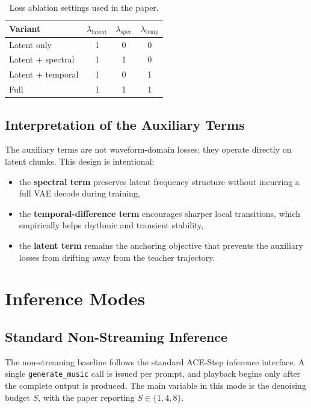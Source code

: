 \documentclass[11pt]{article}
\begin{document}
\begin{table}[H]
\centering
\caption{Loss ablation settings used in the paper.}
\label{tab:supp_loss_variants}
\begin{tabular}{@{}lccc@{}}
\toprule
\textbf{Variant} & \(\lambda_{\mathrm{latent}}\) & \(\lambda_{\mathrm{spec}}\) & \(\lambda_{\mathrm{temp}}\) \\
\midrule
Latent only & 1 & 0 & 0 \\
Latent + spectral & 1 & 1 & 0 \\
Latent + temporal & 1 & 0 & 1 \\
Full & 1 & 1 & 1 \\
\bottomrule
\end{tabular}
\end{table}

\subsection{Interpretation of the Auxiliary Terms}

The auxiliary terms are not waveform-domain losses; they operate directly on latent chunks. This design is intentional:
\begin{itemize}
    \item the \textbf{spectral term} preserves latent frequency structure without incurring a full VAE decode during training,
    \item the \textbf{temporal-difference term} encourages sharper local transitions, which empirically helps rhythmic and transient stability,
    \item the \textbf{latent term} remains the anchoring objective that prevents the auxiliary losses from drifting away from the teacher trajectory.
\end{itemize}

\section{Inference Modes}

\subsection{Standard Non-Streaming Inference}

The non-streaming baseline follows the standard ACE-Step inference interface. A single \texttt{generate\_music} call is issued per prompt, and playback begins only after the complete output is produced. The main variable in this mode is the denoising budget \(S\), with the paper reporting \(S\in\{1,4,8\}\).
\end{document}

